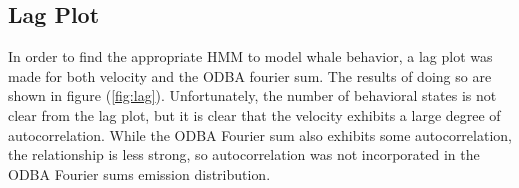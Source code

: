 \subsection{Lag Plot}

In order to find the appropriate HMM to model whale behavior, a lag plot was made for both velocity and the ODBA fourier sum. The results of doing so are shown in figure (\ref{fig:lag}). Unfortunately, the number of behavioral states is not clear from the lag plot, but it is clear that the velocity exhibits a large degree of autocorrelation. While the ODBA Fourier sum also exhibits some autocorrelation, the relationship is less strong, so autocorrelation was not incorporated in the ODBA Fourier sums emission distribution.